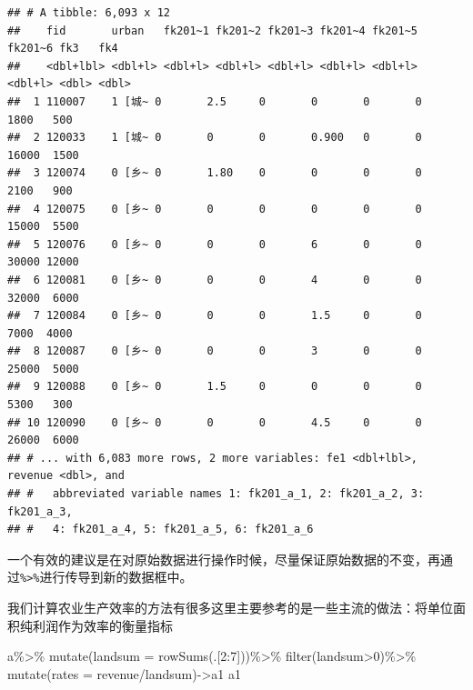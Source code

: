 \documentclass[
  oneside]{book}
\newenvironment{Shaded}{\begin{snugshade}}{\end{snugshade}}
\newcommand{\AttributeTok}[1]{\textcolor[rgb]{0.77,0.63,0.00}{#1}}
\newcommand{\DecValTok}[1]{\textcolor[rgb]{0.00,0.00,0.81}{#1}}
\newcommand{\FunctionTok}[1]{\textcolor[rgb]{0.00,0.00,0.00}{#1}}
\newcommand{\NormalTok}[1]{#1}
\newcommand{\OtherTok}[1]{\textcolor[rgb]{0.56,0.35,0.01}{#1}}
\newcommand{\SpecialCharTok}[1]{\textcolor[rgb]{0.00,0.00,0.00}{#1}}
\begin{document}
\begin{verbatim}
## # A tibble: 6,093 x 12
##    fid       urban   fk201~1 fk201~2 fk201~3 fk201~4 fk201~5 fk201~6 fk3   fk4  
##    <dbl+lbl> <dbl+l> <dbl+l> <dbl+l> <dbl+l> <dbl+l> <dbl+l> <dbl+l> <dbl> <dbl>
##  1 110007    1 [城~ 0       2.5     0       0       0       0        1800   500
##  2 120033    1 [城~ 0       0       0       0.900   0       0       16000  1500
##  3 120074    0 [乡~ 0       1.80    0       0       0       0        2100   900
##  4 120075    0 [乡~ 0       0       0       0       0       0       15000  5500
##  5 120076    0 [乡~ 0       0       0       6       0       0       30000 12000
##  6 120081    0 [乡~ 0       0       0       4       0       0       32000  6000
##  7 120084    0 [乡~ 0       0       0       1.5     0       0        7000  4000
##  8 120087    0 [乡~ 0       0       0       3       0       0       25000  5000
##  9 120088    0 [乡~ 0       1.5     0       0       0       0        5300   300
## 10 120090    0 [乡~ 0       0       0       4.5     0       0       26000  6000
## # ... with 6,083 more rows, 2 more variables: fe1 <dbl+lbl>, revenue <dbl>, and
## #   abbreviated variable names 1: fk201_a_1, 2: fk201_a_2, 3: fk201_a_3,
## #   4: fk201_a_4, 5: fk201_a_5, 6: fk201_a_6
\end{verbatim}

一个有效的建议是在对原始数据进行操作时候，尽量保证原始数据的不变，再通过\texttt{\%\textgreater{}\%}进行传导到新的数据框中。

我们计算农业生产效率的方法有很多这里主要参考的是一些主流的做法：将单位面积纯利润作为效率的衡量指标

\begin{Shaded}
\begin{Highlighting}[]
\NormalTok{a}\SpecialCharTok{\%\textgreater{}\%}
  \FunctionTok{mutate}\NormalTok{(}\AttributeTok{landsum =} \FunctionTok{rowSums}\NormalTok{(.[}\DecValTok{2}\SpecialCharTok{:}\DecValTok{7}\NormalTok{]))}\SpecialCharTok{\%\textgreater{}\%}
  \FunctionTok{filter}\NormalTok{(landsum}\SpecialCharTok{\textgreater{}}\DecValTok{0}\NormalTok{)}\SpecialCharTok{\%\textgreater{}\%}
  \FunctionTok{mutate}\NormalTok{(}\AttributeTok{rates =}\NormalTok{ revenue}\SpecialCharTok{/}\NormalTok{landsum)}\OtherTok{{-}\textgreater{}}\NormalTok{a1}
\NormalTok{a1}
\end{Highlighting}
\end{Shaded}
\end{document}
